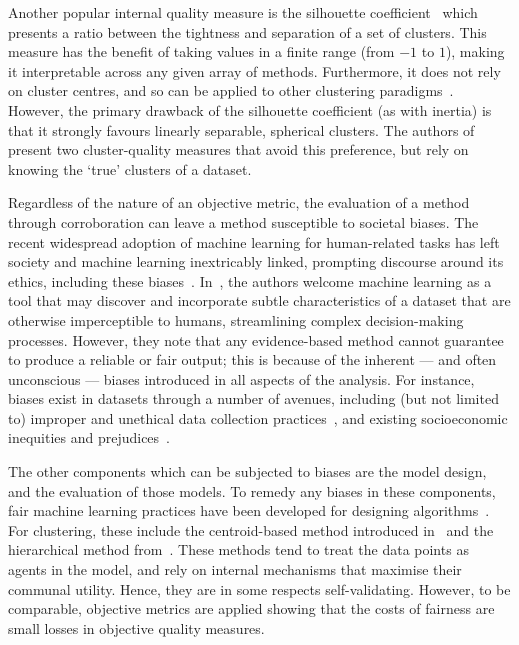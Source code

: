 Another popular internal quality measure is the silhouette
coefficient~\cite{Rousseeuw1987} which presents a ratio between the tightness
and separation of a set of clusters. This measure has the benefit of taking
values in a finite range (from \(-1\) to \(1\)), making it interpretable across
any given array of methods. Furthermore, it does not rely on cluster centres,
and so can be applied to other clustering
paradigms~\cite{Garcia2011,Guan2019,Starczewski2015}. However, the primary
drawback of the silhouette coefficient (as with inertia) is that it strongly
favours linearly separable, spherical clusters. The authors
of~\cite{Frederix2004} present two cluster-quality measures that avoid this
preference, but rely on knowing the `true' clusters of a dataset.

Regardless of the nature of an objective metric, the evaluation of a method
through corroboration can leave a method susceptible to societal biases. The
recent widespread adoption of machine learning for human-related tasks has left
society and machine learning inextricably linked, prompting discourse around its
ethics, including these
biases~\cite{Barocas2019,Grote2020,Mehrabi2019,Obermeyer2019,Saltz2019}.
In~\cite{Barocas2019}, the authors welcome machine learning as a tool that may
discover and incorporate subtle characteristics of a dataset that are otherwise
imperceptible to humans, streamlining complex decision-making processes.
However, they note that any evidence-based method cannot guarantee to produce a
reliable or fair output; this is because of the inherent --- and often
unconscious --- biases introduced in all aspects of the analysis. For instance,
biases exist in datasets through a number of avenues, including (but not limited
to) improper and unethical data collection practices~\cite{Prabhu2020}, and
existing socioeconomic inequities and
prejudices~\cite{Crawford2013,Rangvid2019}.

The other components which can be subjected to biases are the model design, and
the evaluation of those models. To remedy any biases in these components, fair
machine learning practices have been developed for designing
algorithms~\cite{CorbettDavies2018,Friedler2016,Goelz2019,Kearns2017}. For
clustering, these include the centroid-based method introduced
in~\cite{Chen2019} and the hierarchical method from~\cite{Ahmadian2020}. These
methods tend to treat the data points as agents in the model, and rely on
internal mechanisms that maximise their communal utility. Hence, they are in
some respects self-validating. However, to be comparable, objective metrics are
applied showing that the costs of fairness are small losses in objective quality
measures.

